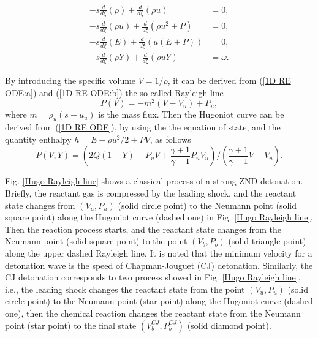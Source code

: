 \documentclass[preprint,12pt]{elsarticle}
\begin{document}
\begin{subequations}\label{1D RE ODE}
  \begin{align}
    \displaystyle -s\frac{d}{d\xi}(\rho) + \frac{d}{d\xi}(\rho u) &= 0,\label{1D RE ODE:a}\\
    \displaystyle -s\frac{d}{d\xi}(\rho u) + \frac{d}{d\xi}(\rho u^2 + P) &= 0,\label{1D RE ODE:b}\\
    \displaystyle -s\frac{d}{d\xi}(E) + \frac{d}{d\xi}(u(E + P)) &= 0,\label{1D RE ODE:c}\\
    \displaystyle -s\frac{d}{d\xi}(\rho Y) + \frac{d}{d\xi}(\rho u Y) &= \omega.\label{1D RE ODE:d}
  \end{align}
\end{subequations}

By introducing the specific volume $V = 1/\rho$, it can be derived
from (\ref{1D RE ODE:a}) and (\ref{1D RE ODE:b}) the so-called
Rayleigh line
\begin{equation}\label{Rayleigh Line}
  P(V) = -m^2(V - V_u) + P_u,
\end{equation}
where $m = \rho_u(s - u_u)$ is the mass flux. Then the Hugoniot curve
can be derived from (\ref{1D RE ODE}), by using the the equation of
state, and the quantity enthalpy $h = E - \rho u^2/2 + PV$, as
follows
\begin{equation}
  P(V, Y) = \left (2Q(1 - Y) - P_uV + \displaystyle\frac{\gamma + 1}{\gamma - 1}P_uV_u\right ) \Big/ \left (\displaystyle\frac{\gamma + 1}{\gamma - 1}V-V_u\right ).
\end{equation}

Fig. \ref{Hugo Rayleigh line} shows a classical process of a strong ZND
detonation. Briefly, the reactant gas is compressed by the leading shock, and
the reactant state changes from $(V_u, P_u)$ (solid circle point) to the Neumann
point (solid square point) along the Hugoniot curve (dashed one) in Fig.
\ref{Hugo Rayleigh line}. Then the reaction process starts, and the reactant
state changes from the Neumann point (solid square point) to the point $(V_b,
P_b)$ (solid triangle point) along the upper dashed Rayleigh line. It is noted
that the minimum velocity for a detonation wave is the speed of Chapman-Jouguet
(CJ) detonation. Similarly, the CJ detonation corresponds to two process showed
in Fig. \ref{Hugo Rayleigh line}, i.e., the leading shock changes the reactant
state from the point $(V_u, P_u)$ (solid circle point) to the Neumann point
(star point) along the Hugoniot curve (dashed one), then the chemical reaction
changes the reactant state from the Neumann point (star point) to the final
state $(V^{CJ}_b, P^{CJ}_b)$ (solid diamond point).
\end{document}
